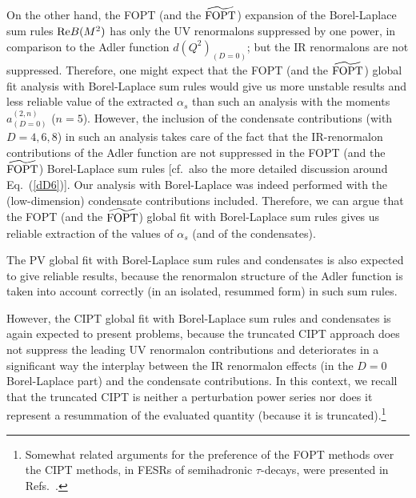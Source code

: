 \documentclass[aps,nofootinbib,showkeys,noshowpacs,preprintnumbers,amsmath,amssymb]{revtex4}
\begin{document}
On the other hand, the FOPT (and the ${\widetilde {\rm FOPT}}$) expansion of the Borel-Laplace sum rules ${\rm Re} B(M^2)$ has only the UV renormalons suppressed by one power, in comparison to the Adler function $d(Q^2)_{(D=0)}$; but the IR renormalons are not suppressed. Therefore, one might expect that the FOPT (and the ${\widetilde {\rm FOPT}}$) global fit analysis with Borel-Laplace sum rules would give us more unstable results and less reliable value of the extracted $\alpha_s$ than such an analysis with the moments $a^{(2,n)}_{(D=0)}$ ($n=5$). However, the inclusion of the condensate contributions (with $D=4, 6, 8$) in such an analysis takes care of the fact that the IR-renormalon contributions of the Adler function are not suppressed in the FOPT  (and the ${\widetilde {\rm FOPT}}$) Borel-Laplace sum rules [cf.~also the more detailed discussion around Eq.~(\ref{dD6})]. Our analysis with Borel-Laplace was indeed performed with the (low-dimension) condensate contributions included. Therefore, we can argue that the FOPT (and the ${\widetilde {\rm FOPT}}$) global fit with Borel-Laplace sum rules gives us reliable extraction of the values of $\alpha_s$ (and of the condensates).

The PV global fit with Borel-Laplace sum rules and condensates is also expected to give reliable results, because the renormalon structure of the Adler function is taken into account correctly (in an isolated, resummed form) in such sum rules.

However, the CIPT global fit with Borel-Laplace sum rules and condensates is again expected to present problems, because the truncated CIPT approach does not suppress the leading UV renormalon contributions and deteriorates in a significant way the interplay between the IR renormalon effects (in the $D=0$ Borel-Laplace part) and the condensate contributions. In this context, we recall that the truncated CIPT is neither a perturbation power series nor does it represent a resummation of the evaluated quantity (because it is truncated).\footnote{Somewhat related arguments for the preference of the FOPT methods over the CIPT methods, in FESRs of semihadronic $\tau$-decays, were presented in Refs.~\cite{BJ,BJ2,BoiOl,HoangR}.} 
\end{document}
